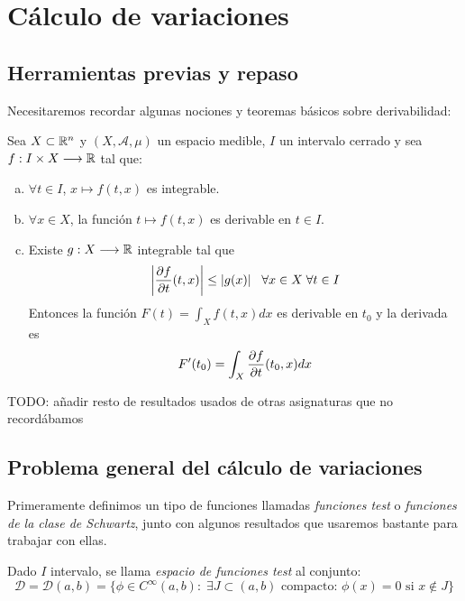 
\chapter{Cálculo de variaciones}

\section{Herramientas previas y repaso}

Necesitaremos recordar algunas nociones y teoremas básicos sobre derivabilidad:

\begin{theorem}
\label{derivadaparametro}
Sea $X\subset\mathbb{R}^n$ y $(X,\mathcal{A},\mu)$ un espacio medible, $I$ un intervalo cerrado y sea $f : I\times X \longrightarrow \mathbb{R}$ tal que:

\begin{enumerate}[(a)]
\item $\forall t \in I$, $x\mapsto f(t,x)$ es integrable.
\item $\forall x\in X$, la función $t\mapsto f(t,x)$ es derivable en $t\in I$.
\item Existe $g : X \longrightarrow \mathbb{R}$ integrable tal que
\[
\left|\frac{\partial f }{\partial t }(t,x)\right|\leq |g(x)| \;\;\; \forall x\in X\; \forall t \in I
\]
Entonces la función $F(t)=\int_Xf(t,x)dx$ es derivable en $t_0$ y la derivada es 
\[
F'(t_0)=\displaystyle\int_X\frac{\partial f }{\partial t }(t_0,x)dx
\]
\end{enumerate}

\end{theorem}

TODO: añadir resto de resultados usados de otras asignaturas que no recordábamos

\section{Problema general del cálculo de variaciones}

Primeramente definimos un tipo de funciones llamadas \textit{funciones test} o \textit{funciones de la clase de Schwartz}, junto con algunos resultados que usaremos bastante para trabajar con ellas.

\begin{definition}
\label{funcionestest}
Dado $I$ intervalo, se llama \textit{espacio de funciones test} al conjunto:
\[
\mathcal{D} = \mathcal{D}(a,b) = \{\phi\in C^{\infty}(a,b): \; \exists J\subset(a,b) \text{ compacto: } \phi(x)=0 \text{ si } x \notin J\}
\]
\end{definition}

